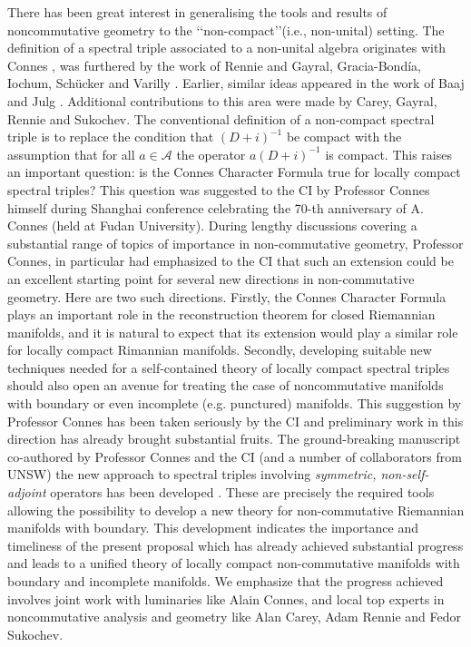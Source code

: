 \documentclass[12pt]{article}
\begin{document}
There has been great interest in generalising the tools and results of noncommutative geometry to the \lq\lq non-compact\rq\rq (i.e., non-unital) setting. The definition of a spectral triple associated to a non-unital algebra originates with Connes \cite{Connes-reality}, was furthered by the work of Rennie \cite{Rennie} and Gayral, Gracia-Bond\'ia, Iochum, Sch\"ucker and Varilly \cite{gayral-moyal}. Earlier, similar ideas appeared in the work of Baaj and Julg \cite{Baaj-Julg}. Additional contributions to this area were made by Carey, Gayral, Rennie and Sukochev\cite{CGRS}. The conventional definition  of a non-compact spectral triple is to replace the condition that $(D+i)^{-1}$ be compact with the assumption that for all $a \in \mathcal{A}$ the operator $a(D+i)^{-1}$ is compact. This raises an important question: is the Connes Character Formula true for locally compact spectral triples? This question was suggested to the CI by Professor Connes himself during Shanghai conference celebrating the 70-th anniversary of A. Connes (held at Fudan University). During lengthy discussions covering a substantial range of topics of importance in non-commutative geometry, Professor Connes, in particular had emphasized to the CI that such an extension could be an excellent starting point for several new directions in non-commutative geometry. Here are two such directions. Firstly, the Connes Character Formula plays  an important role in the reconstruction theorem for closed Riemannian manifolds, and it is natural to expect that its extension would play a similar role for locally compact Rimannian manifolds. Secondly, developing suitable new techniques needed for a self-contained theory of locally compact spectral triples should also open an avenue for treating the case of noncommutative manifolds with boundary or even incomplete (e.g. punctured) manifolds. This suggestion by Professor Connes has been taken seriously by the CI and preliminary work in this direction has already brought substantial fruits. The ground-breaking manuscript co-authored by Professor Connes and the CI (and a number of collaborators from UNSW) the new approach to spectral triples involving {\it symmetric, non-self-adjoint} operators has been developed \cite{Connes_team_symmetric}. These are precisely the required tools allowing the possibility to develop a new theory for non-commutative Riemannian manifolds with boundary. This development indicates the importance and timeliness of the present proposal which has already achieved substantial progress and leads to a unified theory of locally compact non-commutative manifolds with boundary and incomplete manifolds. We emphasize that the progress achieved involves joint work with luminaries like Alain Connes, and local top experts in noncommutative analysis and geometry like Alan Carey, Adam Rennie and Fedor Sukochev.
    
\end{document}
